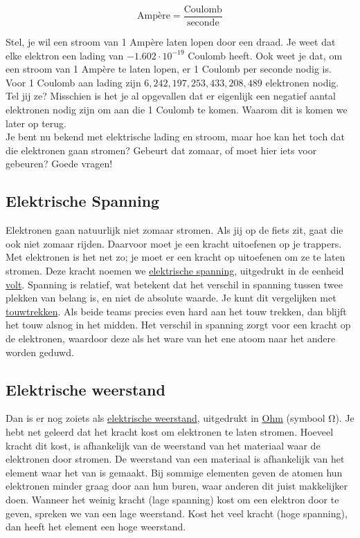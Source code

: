 \begin{equation}
	\text{Ampère} = \frac{\text{Coulomb}}{\text{seconde}}
\end{equation}

Stel, je wil een stroom van 1 Ampère laten lopen door een draad. Je weet dat elke elektron een lading van $-1.602 \cdot 10^{-19}$ Coulomb heeft. Ook weet je dat, om een stroom van 1 Ampère te laten lopen, er 1 Coulomb per seconde nodig is. Voor 1 Coulomb aan lading zijn $6,242,197,253,433,208,489$ elektronen nodig. Tel jij ze? Misschien is het je al opgevallen dat er eigenlijk een negatief aantal elektronen nodig zijn om aan die 1 Coulomb te komen. Waarom dit is komen we later op terug. \\

Je bent nu bekend met elektrische lading en stroom, maar hoe kan het toch dat die elektronen gaan stromen? Gebeurt dat zomaar, of moet hier iets voor gebeuren? Goede vragen!

\subsection{Elektrische Spanning}
Elektronen gaan natuurlijk niet zomaar stromen. Als jij op de fiets zit, gaat die ook niet zomaar rijden. Daarvoor moet je een kracht uitoefenen op je trappers. Met elektronen is het net zo; je moet er een kracht op uitoefenen om ze te laten stromen. Deze kracht noemen we \href{https://nl.wikipedia.org/wiki/Elektrische_spanning}{elektrische spanning}, uitgedrukt in de eenheid \href{https://nl.wikipedia.org/wiki/Volt_(eenheid)}{volt}. Spanning is relatief, wat betekent dat het verschil in spanning tussen twee plekken van belang is, en niet de absolute waarde. Je kunt dit vergelijken met \href{https://nl.wikipedia.org/wiki/Touwtrekken}{touwtrekken}. Als beide teams precies even hard aan het touw trekken, dan blijft het touw alsnog in het midden. Het verschil in spanning zorgt voor een kracht op de elektronen, waardoor deze als het ware van het ene atoom naar het andere worden geduwd.

\subsection{Elektrische weerstand}
Dan is er nog zoiets als \href{https://nl.wikipedia.org/wiki/Elektrische_weerstand_(eigenschap)}{elektrische weerstand}, uitgedrukt in \href{https://nl.wikipedia.org/wiki/Ohm_(eenheid)}{Ohm} (symbool Ω). Je hebt net geleerd dat het kracht kost om elektronen te laten stromen. Hoeveel kracht dit kost, is afhankelijk van de weerstand van het materiaal waar de elektronen door stromen. De weerstand van een materiaal is afhankelijk van het element waar het van is gemaakt. Bij sommige elementen geven de atomen hun elektronen minder graag door aan hun buren, waar anderen dit juist makkelijker doen. Wanneer het weinig kracht (lage spanning) kost om een elektron door te geven, spreken we van een lage weerstand. Kost het veel kracht (hoge spanning), dan heeft het element een hoge weerstand. \\

